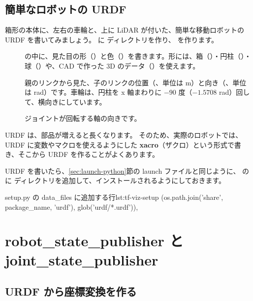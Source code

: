 \subsection{簡単なロボットの URDF}

箱形の本体に、左右の車輪と、上に LiDAR が付いた、簡単な移動ロボットの URDF を書いてみましょう。
 に  ディレクトリを作り、 を作ります。


\begin{description}
  \item[]  の中に、見た目の形（）と色（）を書きます。形には、箱（）・円柱（）・球（）や、CAD で作った 3D のデータ（）を使えます。
  \item[] 親のリンクから見た、子のリンクの位置（、単位は m）と向き（、単位は rad）です。車輪は、円柱を x 軸まわりに $-90$ 度（$-1.5708$ rad）回して、横向きにしています。
  \item[] ジョイントが回転する軸の向きです。
\end{description}

URDF は、部品が増えると長くなります。
そのため、実際のロボットでは、URDF に変数やマクロを使えるようにした \textbf{xacro}（ザクロ）という形式で書き、そこから URDF を作ることがよくあります。

URDF を書いたら、\ref{sec:launch-python}節の launch ファイルと同じように、 の  に  ディレクトリを追加して、インストールされるようにしておきます。

\begin{codelisting}[style=python, numbers=none, xleftmargin=0pt, framexleftmargin=0pt]{setup.py の data\_files に追加する行}{lst:tf-viz-setup}
        (os.path.join('share', package_name, 'urdf'),
            glob('urdf/*.urdf')),
\end{codelisting}

\section{robot\_state\_publisher と joint\_state\_publisher}
\label{sec:tf-viz-rsp}

\subsection{URDF から座標変換を作る}

